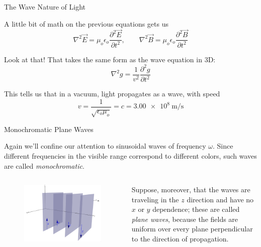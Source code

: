 \documentclass{beamer}
\begin{document}
\begin{frame}{The Wave Nature of Light}

A little bit of math on the previous equations gets us
\begin{equation*}
	\nabla^2 \vec{E} = \mu_o \epsilon_o \frac{\partial^2 \vec{E}}{\partial t^2}, \qquad \nabla^2 \vec{B} = \mu_o \epsilon_o \frac{\partial^2 \vec{B}}{\partial t^2}
\end{equation*}

Look at that! That takes the same form as the wave equation in 3D:
\begin{equation*}
	\nabla^2 g = \frac{1}{v^2} \frac{\partial^2 g}{\partial t^2}
\end{equation*}

This tells us that in a vacuum, light propagates as a wave, with speed
\begin{equation*}
	v = \frac{1}{\sqrt{\epsilon_o \mu_o}} = c = \SI{3.00e8}{\metre/\second}
\end{equation*}

\end{frame}

\begin{frame}{Monochromatic Plane Waves}

Again we'll confine our attention to sinusoidal waves of frequency $\omega$. Since different frequencies in the visible range correspond to different colors, such waves are called \emph{monochromatic}.

\begin{columns}

\begin{figure}[H]
\centering
\includegraphics[height=0.50\textheight]{figures/plane_wave.png}
\end{figure}

Suppose, moreover, that the waves are traveling in the $z$ direction and have no $x$ or $y$ dependence; these are called \emph{plane waves}, because the fields are uniform over every plane perpendicular to the direction of propagation.

\end{columns}

\end{frame}
\end{document}
